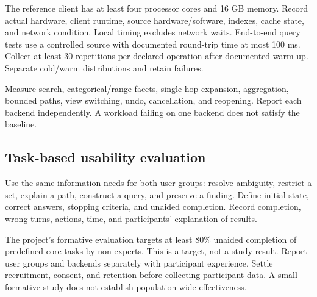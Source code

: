 \documentclass[11pt,a4paper]{article}
\begin{document}
The reference client has at least four processor cores and 16 GB memory. Record actual hardware, client runtime, source hardware/software, indexes, cache state, and network condition. Local timing excludes network waits. End-to-end query tests use a controlled source with documented round-trip time at most 100 ms. Collect at least 30 repetitions per declared operation after documented warm-up. Separate cold/warm distributions and retain failures.

Measure search, categorical/range facets, single-hop expansion, aggregation, bounded paths, view switching, undo, cancellation, and reopening. Report each backend independently. A workload failing on one backend does not satisfy the baseline.

\subsection{Task-based usability evaluation}
Use the same information needs for both user groups: resolve ambiguity, restrict a set, explain a path, construct a query, and preserve a finding. Define initial state, correct answers, stopping criteria, and unaided completion. Record completion, wrong turns, actions, time, and participants' explanation of results.

The project's formative evaluation targets at least 80\% unaided completion of predefined core tasks by non-experts. This is a target, not a study result. Report user groups and backends separately with participant experience. Settle recruitment, consent, and retention before collecting participant data. A small formative study does not establish population-wide effectiveness.
\end{document}
